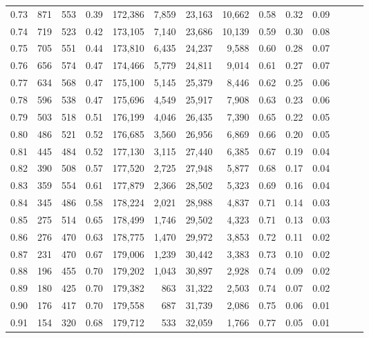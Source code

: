 \begin{tabular}{rrrrrrrrrrrrrr}
0.73 &    871 &  553 &  0.39 &  172,386 &    7,859 &  23,163 &  10,662 &  0.58 &  0.32 &      0.09 \\
0.74 &    719 &  523 &  0.42 &  173,105 &    7,140 &  23,686 &  10,139 &  0.59 &  0.30 &      0.08 \\
0.75 &    705 &  551 &  0.44 &  173,810 &    6,435 &  24,237 &   9,588 &  0.60 &  0.28 &      0.07 \\
0.76 &    656 &  574 &  0.47 &  174,466 &    5,779 &  24,811 &   9,014 &  0.61 &  0.27 &      0.07 \\
0.77 &    634 &  568 &  0.47 &  175,100 &    5,145 &  25,379 &   8,446 &  0.62 &  0.25 &      0.06 \\
0.78 &    596 &  538 &  0.47 &  175,696 &    4,549 &  25,917 &   7,908 &  0.63 &  0.23 &      0.06 \\
0.79 &    503 &  518 &  0.51 &  176,199 &    4,046 &  26,435 &   7,390 &  0.65 &  0.22 &      0.05 \\
0.80 &    486 &  521 &  0.52 &  176,685 &    3,560 &  26,956 &   6,869 &  0.66 &  0.20 &      0.05 \\
0.81 &    445 &  484 &  0.52 &  177,130 &    3,115 &  27,440 &   6,385 &  0.67 &  0.19 &      0.04 \\
0.82 &    390 &  508 &  0.57 &  177,520 &    2,725 &  27,948 &   5,877 &  0.68 &  0.17 &      0.04 \\
0.83 &    359 &  554 &  0.61 &  177,879 &    2,366 &  28,502 &   5,323 &  0.69 &  0.16 &      0.04 \\
0.84 &    345 &  486 &  0.58 &  178,224 &    2,021 &  28,988 &   4,837 &  0.71 &  0.14 &      0.03 \\
0.85 &    275 &  514 &  0.65 &  178,499 &    1,746 &  29,502 &   4,323 &  0.71 &  0.13 &      0.03 \\
0.86 &    276 &  470 &  0.63 &  178,775 &    1,470 &  29,972 &   3,853 &  0.72 &  0.11 &      0.02 \\
0.87 &    231 &  470 &  0.67 &  179,006 &    1,239 &  30,442 &   3,383 &  0.73 &  0.10 &      0.02 \\
0.88 &    196 &  455 &  0.70 &  179,202 &    1,043 &  30,897 &   2,928 &  0.74 &  0.09 &      0.02 \\
0.89 &    180 &  425 &  0.70 &  179,382 &      863 &  31,322 &   2,503 &  0.74 &  0.07 &      0.02 \\
0.90 &    176 &  417 &  0.70 &  179,558 &      687 &  31,739 &   2,086 &  0.75 &  0.06 &      0.01 \\
0.91 &    154 &  320 &  0.68 &  179,712 &      533 &  32,059 &   1,766 &  0.77 &  0.05 &      0.01 \\

\end{tabular}
